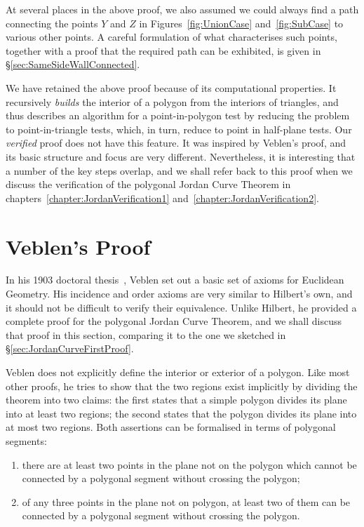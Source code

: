 \label{sec:Jordan1SameSideDiscussion}At several places in the above proof, we also assumed we could always find a path connecting the points $Y$ and $Z$ in Figures~\ref{fig:UnionCase} and~\ref{fig:SubCase} to various other points. A careful formulation of what characterises such points, together with a proof that the required path can be exhibited, is given in \S\ref{sec:SameSideWallConnected}.

We have retained the above proof because of its computational properties. It recursively \emph{builds} the interior of a polygon from the interiors of triangles, and thus describes an algorithm for a point-in-polygon test by reducing the problem to point-in-triangle tests, which, in turn, reduce to point in half-plane tests. Our \emph{verified} proof does not have this feature. It was inspired by Veblen's proof, and its basic structure and focus are very different. Nevertheless, it is interesting that a number of the key steps overlap, and we shall refer back to this proof when we discuss the verification of the polygonal Jordan Curve Theorem in chapters~\ref{chapter:JordanVerification1} and~\ref{chapter:JordanVerification2}.

\section{Veblen's Proof}\label{sec:VeblenProof}
In his 1903 doctoral thesis~\cite{Veblenphd}, Veblen set out a basic set of axioms for Euclidean Geometry. His incidence and order axioms are very similar to Hilbert's own, and it should not be difficult to verify their equivalence. Unlike Hilbert, he provided a complete proof for the polygonal Jordan Curve Theorem, and we shall discuss that proof in this section, comparing it to the one we sketched in \S\ref{sec:JordanCurveFirstProof}.

Veblen does not explicitly define the interior or exterior of a polygon. Like most other proofs, he tries to show that the two regions exist implicitly by dividing the theorem into two claims: the first states that a simple polygon divides its plane into at least two regions; the second states that the polygon divides its plane into at most two regions. Both assertions can be formalised in terms of polygonal segments:
\begin{enumerate}
\item there are at least two points in the plane not on the polygon which cannot be connected by a polygonal segment without crossing the polygon\label{list:VeblenLemma1};
\item of any three points in the plane not on polygon, at least two of them can be connected by a polygonal segment without crossing the polygon.
\end{enumerate}

